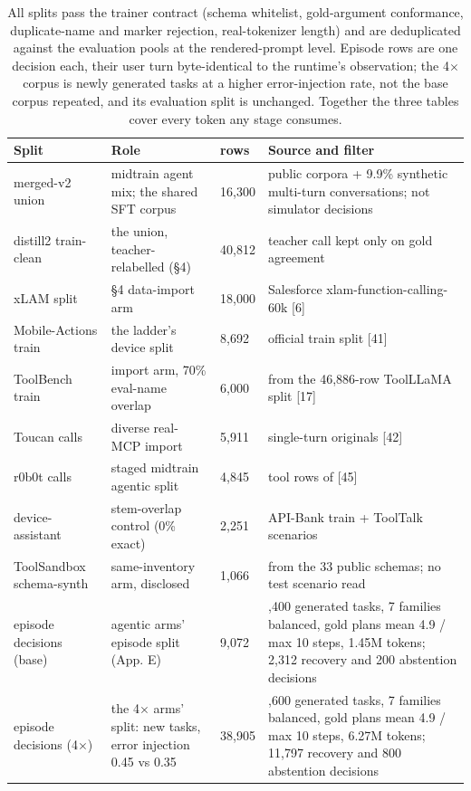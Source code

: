 \documentclass{article}
\begin{document}
\begin{table}[htbp]
\caption{All splits pass the trainer contract (schema whitelist, gold-argument conformance, duplicate-name and marker rejection, real-tokenizer length) and are deduplicated against the evaluation pools at the rendered-prompt level. Episode rows are one decision each, their user turn byte-identical to the runtime's observation; the 4$\times$ corpus is newly generated tasks at a higher error-injection rate, not the base corpus repeated, and its evaluation split is unchanged. Together the three tables cover every token any stage consumes.}
\label{tab:train_sources}
\centering
\footnotesize\setlength{\tabcolsep}{3pt}
\begin{tabularx}{\textwidth}{l>{\raggedright\arraybackslash}Xl>{\raggedright\arraybackslash}X}
\toprule
Split & Role & rows & Source and filter \\
\midrule
merged-v2 union & midtrain agent mix; the shared SFT corpus & 16,300 & 3 public corpora + 9.9\% synthetic multi-turn conversations; not simulator decisions \\
distill2 train-clean & the union, teacher-relabelled (\S4) & 40,812 & teacher call kept only on gold agreement \\
xLAM split & \S4 data-import arm & 18,000 & Salesforce xlam-function-calling-60k [6] \\
Mobile-Actions train & the ladder's device split & 8,692 & official train split [41] \\
ToolBench train & import arm, 70\% eval-name overlap & 6,000 & from the 46,886-row ToolLLaMA split [17] \\
Toucan calls & diverse real-MCP import & 5,911 & single-turn originals [42] \\
r0b0t calls & staged midtrain agentic split & 4,845 & tool rows of [45] \\
device-assistant & stem-overlap control (0\% exact) & 2,251 & API-Bank train + ToolTalk scenarios \\
ToolSandbox schema-synth & same-inventory arm, disclosed & 1,066 & from the 33 public schemas; no test scenario read \\
episode decisions (base) & agentic arms' episode split (App. E) & 9,072 & 1,400 generated tasks, 7 families balanced, gold plans mean 4.9 / max 10 steps, 1.45M tokens; 2,312 recovery and 200 abstention decisions \\
episode decisions (4$\times$) & the 4$\times$ arms' split: new tasks, error injection 0.45 vs 0.35 & 38,905 & 5,600 generated tasks, 7 families balanced, gold plans mean 4.9 / max 10 steps, 6.27M tokens; 11,797 recovery and 800 abstention decisions \\
\bottomrule
\end{tabularx}
\end{table}
\end{document}

